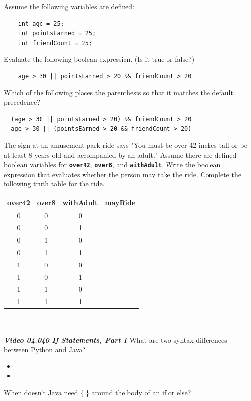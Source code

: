 \documentclass[letterpaper,11pt]{exam}
\newcommand{\videoheading}[1]{\Large\textbf{\textit{#1}}}
\begin{document}
\begin{questions}
\begin{samepage}
\question Assume the following variables are defined:
\begin{verbatim}
    int age = 25;
    int pointsEarned = 25;
    int friendCount = 25;
\end{verbatim}
Evaluate the following boolean expression.  (Is it true or false?)
\begin{verbatim}
    age > 30 || pointsEarned > 20 && friendCount > 20
\end{verbatim}
\question Which of the following places the parenthesis so that it matches the default precedence?
\begin{verbatim}
  (age > 30 || pointsEarned > 20) && friendCount > 20
  age > 30 || (pointsEarned > 20 && friendCount > 20)
\end{verbatim}
\end{samepage}
\begin{minipage}{\textwidth}
  \question The sign at an amusement park ride says "You must be over 42 inches tall or be at least 8 years old and accompanied by an adult."  Assume there are defined boolean variables for \texttt{\textbf{over42}}, \texttt{\textbf{over8}}, and \texttt{\textbf{withAdult}}.  Write the boolean expression that evaluates whether the person may take the ride.
  \vspace{1cm}
  Complete the following truth table for the ride.\\
  \begin{tabular}{|c|c|c|c|}
    \hline
      over42 & over8 & withAdult & mayRide \\
      \hline
      0 & 0 & 0 & \\\hline
      0 & 0 & 1 & \\\hline
      0 & 1 & 0 & \\\hline
      0 & 1 & 1 & \\\hline
      1 & 0 & 0 & \\\hline
      1 & 0 & 1 & \\\hline
      1 & 1 & 0 & \\\hline
      1 & 1 & 1 & \\
    \hline
  \end{tabular}
\end{minipage}
\\
\\
\videoheading{Video 04.040 If Statements, Part 1}
\question  What are two syntax differences between Python and Java?
\begin{itemize}
  \item  
  \item  
\end{itemize}
\question When doesn't Java need \{ \} around the body of an if or else?
\vspace{1.cm}


\end{questions}
\end{document}
